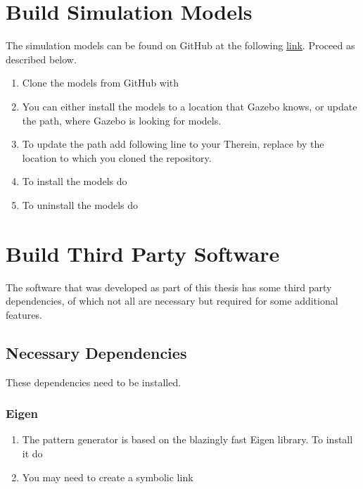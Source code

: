\section{Build Simulation Models}
\label{sec::A4_sm}
The simulation models can be found on GitHub at the following \href{https://github.com/mhubii/gazebo_models/}{\underline{link}}. Proceed as described below.
\begin{enumerate}
	\item Clone the models from GitHub with
	\newline {}
	\item You can either install the models to a location that Gazebo knows, or update the path, where Gazebo is looking for models.
	\item To update the path add following line to your 
	\newline {}
	\newline Therein, replace \inlinecode{}{<>} by the location to which you cloned the repository.
	\item To install the models do
	\newline {}
	\newline {}
	\newline {}
	\item To uninstall the models do
	\newline {}
	\newline {}
\end{enumerate}
\section{Build Third Party Software}
\label{sec::A5_tp}
The software that was developed as part of this thesis has some third party dependencies, of which not all are necessary but required for some additional features.
\subsection{Necessary Dependencies}
\label{sec::A51_nd}
These dependencies need to be installed.
\subsubsection{Eigen}
\begin{enumerate}
	\item The pattern generator is based on the blazingly fast Eigen library. To install it do
	\newline {}
	\item You may need to create a symbolic link
	\newline {}
	\newline {}
\end{enumerate}
